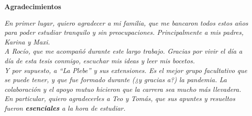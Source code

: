 \thispagestyle{plain}
\begin{center}
\large
\textbf{Agradecimientos}
\end{center}

\textit{
En primer lugar, quiero agradecer a mi familia, que me bancaron todos estos años para poder estudiar tranquilo y sin preocupaciones. Principalmente a mis padres, \mbox{Karina} y \mbox{Maxi}.
} \\

\textit{
A Rocío, que me acompañó durante este largo trabajo. Gracias por vivir el día a día de esta tesis conmigo,  escuchar mis ideas y leer mis bocetos.
} \\

\textit{
Y por supuesto, a \enquote{La Plebe} y sus extensiones. Es el mejor grupo facultativo que se puede tener, y que fue formado durante (¿y gracias a?) la pandemia. La colaboración y el apoyo mutuo hicieron que la carrera sea mucho más llevadera. En particular, quiero agradecerles a Teo y Tomás, que sus apuntes y resueltos fueron \textbf{esenciales} a la hora de estudiar.
}

\clearpage
